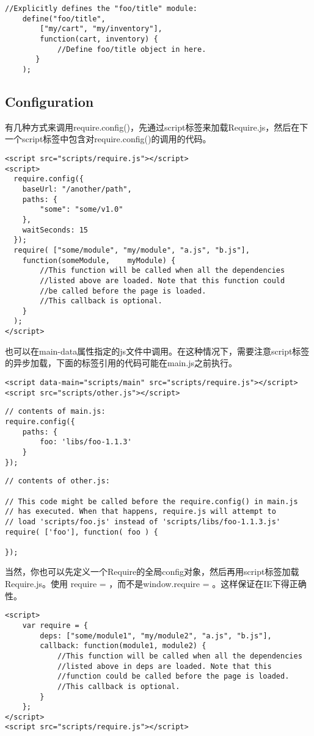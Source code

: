     \begin{lstlisting}
//Explicitly defines the "foo/title" module:
    define("foo/title",
        ["my/cart", "my/inventory"],
        function(cart, inventory) {
            //Define foo/title object in here.
       }
    );
    \end{lstlisting}

\subsection{Configuration}

    有几种方式来调用require.config()，先通过script标签来加载Require.js，然后在下一个script标签中包含对require.config()的调用的代码。
    \begin{lstlisting}
<script src="scripts/require.js"></script>
<script>
  require.config({
    baseUrl: "/another/path",
    paths: {
        "some": "some/v1.0"
    },
    waitSeconds: 15
  });
  require( ["some/module", "my/module", "a.js", "b.js"],
    function(someModule,    myModule) {
        //This function will be called when all the dependencies
        //listed above are loaded. Note that this function could
        //be called before the page is loaded.
        //This callback is optional.
    }
  );
</script>
    \end{lstlisting}
    也可以在main-data属性指定的js文件中调用。在这种情况下，需要注意script标签的异步加载，下面的标签引用的代码可能在main.js之前执行。
    \begin{lstlisting}
<script data-main="scripts/main" src="scripts/require.js"></script>
<script src="scripts/other.js"></script>
    \end{lstlisting}
    \begin{lstlisting}
// contents of main.js:
require.config({
    paths: {
        foo: 'libs/foo-1.1.3'
    }
});
    \end{lstlisting}
    \begin{lstlisting}
// contents of other.js:

// This code might be called before the require.config() in main.js
// has executed. When that happens, require.js will attempt to
// load 'scripts/foo.js' instead of 'scripts/libs/foo-1.1.3.js'
require( ['foo'], function( foo ) {

});
    \end{lstlisting}

    当然，你也可以先定义一个Require的全局config对象，然后再用script标签加载Require.js。使用 require = {}，而不是window.require = {}。这样保证在IE下得正确性。

    \begin{lstlisting}
<script>
    var require = {
        deps: ["some/module1", "my/module2", "a.js", "b.js"],
        callback: function(module1, module2) {
            //This function will be called when all the dependencies
            //listed above in deps are loaded. Note that this
            //function could be called before the page is loaded.
            //This callback is optional.
        }
    };
</script>
<script src="scripts/require.js"></script>
    \end{lstlisting}

